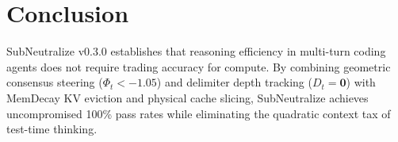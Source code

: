 \documentclass[10pt,twocolumn,letterpaper]{article}
\begin{document}
\section{Conclusion}
SubNeutralize v0.3.0 establishes that reasoning efficiency in multi-turn coding agents does not require trading accuracy for compute. By combining geometric consensus steering ($\Phi_t < -1.05$) and delimiter depth tracking ($D_t = \mathbf{0}$) with MemDecay KV eviction and physical cache slicing, SubNeutralize achieves uncompromised 100\% pass rates while eliminating the quadratic context tax of test-time thinking.



\end{document}

